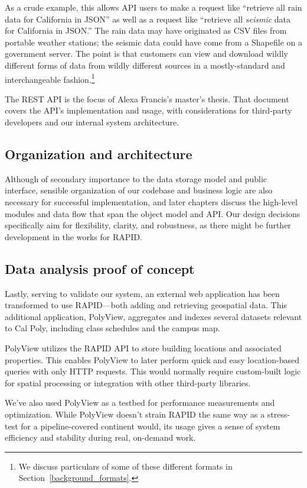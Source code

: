 As a crude example, this allows API users to make a request like ``retrieve all rain data for California in JSON'' as well as a request like ``retrieve all \textit{seismic} data for California in JSON.'' The rain data may have originated as CSV files from portable weather stations; the seismic data could have come from a Shapefile on a government server. The point is that customers can view and download wildly different forms of data from wildly different sources in a mostly-standard and interchangeable fashion.\footnote{We discuss particulars of some of these different formats in Section~\ref{background_formats}.}

The REST API is the focus of Alexa Francis's master's thesis. That document covers the API's implementation and usage, with considerations for third-party developers and our internal system architecture.

\subsection{Organization and architecture}
Although of secondary importance to the data storage model and public interface, sensible organization of our codebase and business logic are also necessary for successful implementation, and later chapters discuss the high-level modules and data flow that span the object model and API. Our design decisions specifically aim for flexibility, clarity, and robustness, as there might be further development in the works for RAPID.

\subsection{Data analysis proof of concept}
\label{polyview_intro}
Lastly, serving to validate our system, an external web application has been transformed to use RAPID---both adding and retrieving geospatial data. This additional application, PolyView, aggregates and indexes several datasets relevant to Cal Poly, including class schedules and the campus map.

PolyView utilizes the RAPID API to store building locations and associated properties. This enables PolyView to later perform quick and easy location-based queries with only HTTP requests. This would normally require custom-built logic for spatial processing or integration with other third-party libraries.

We've also used PolyView as a testbed for performance measurements and optimization. While PolyView doesn't strain RAPID the same way as a stress-test for a pipeline-covered continent would, its usage gives a sense of system efficiency and stability during real, on-demand work.

